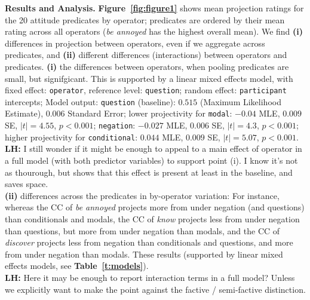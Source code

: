 \documentclass[12pt, a4paper]{article}
\begin{document}
\noindent
{\bf Results and Analysis.} 
	\textbf{Figure~\ref{fig:figure1}} shows mean projection ratings for the 20 attitude predicates by operator; predicates are ordered by their mean rating across all operators (\emph{be annoyed} has the highest overall mean).
	We find \textbf{(i)} differences in projection between operators, even if we aggregate across predicates, and \textbf{(ii)} different differences (interactions) between operators and predicates. \textbf{(i)} the differences between operators, when pooling predicates are small, but signifgicant. This is supported by a linear mixed effects model, with fixed effect: \texttt{operator}, reference level: \texttt{question}; random effect: \texttt{participant} intercepts; Model output: \texttt{question} (baseline): $0.515$ (Maximum Likelihood Estimate), $0.006$ Standard Error; lower projectivity for \texttt{modal}: $-0.04$ MLE, $0.009$ SE, $|t| = 4.55$, $p < 0.001$; \texttt{negation}: $-0.027$ MLE, $0.006$ SE, $|t| = 4.3$, $p < 0.001$; higher projectivity for \texttt{conditional}: $0.044$ MLE, $0.009$ SE, $|t| = 5.07$, $p < 0.001$.\\

	\noindent
	{\bfseries LH: } I still wonder if it might be enough to appeal to a main effect of operator in a full model (with both predictor variables) to support point (i). I know it's not as thourough, but shows that this effect is present at least in the baseline, and saves space.\\

	\noindent \textbf{(ii)} differences across the predicates in by-operator variation: For instance, whereas the CC of \emph{be annoyed} projects more from under negation (and questions) than conditionals and modals, the CC of \emph{know} projects less from under negation than questions, but more from under negation than modals, and the CC of \emph{discover} projects less from negation than conditionals and questions, and more from under negation than modals. These results (supported by linear mixed effects models, see \textbf{Table~\ref{t:models}}).\\

	\noindent
	{\bfseries LH: } Here it may be enough to report interaction terms in a full model? Unless we explicitly want to make the point against the factive / semi-factive distinction.\\
\end{document}
